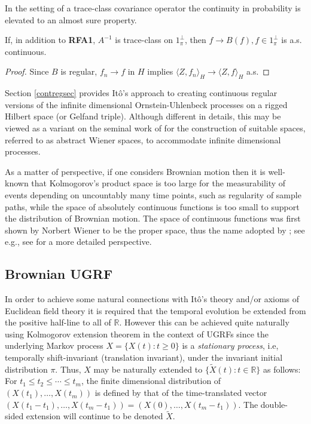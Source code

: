 \documentclass[11pt]{article}
\numberwithin{equation}{section}
\theoremstyle{definition}
\theoremstyle{remark}
\theoremstyle{definition}
\begin{document}
In the setting of a trace-class covariance operator
the continuity in probability
is elevated to an almost sure property.
\begin{cor}\label{traceclasscor}
 If, in addition to {\bf RFA1}, $ A^{-1}$
is trace-class on $1_\pi^\perp$, then
$f\to B(f), f\in 1_\pi^\perp$ is a.s. continuous.
\end{cor}
\begin{proof} Since $B$ is regular,  $f_n\to f$ in $H$ implies $\langle Z,f_n\rangle_H
\to\langle Z,f\rangle_H$ a.s. 
\end{proof}
Section \ref{contregsec} provides It\^o's \cite{ito}
approach to
creating continuous regular versions of the 
infinite dimensional Ornstein-Uhlenbeck processes
on a rigged Hilbert space (or Gelfand triple).  
Although different in details, this may be viewed
as a variant on the seminal work of \cite{grossberk}
for the construction of suitable spaces, referred
to as abstract Wiener spaces,  to accommodate
infinite dimensional processes.
\begin{remark}
As a matter of perspective, if one
considers Brownian motion then it is well-known
that Kolmogorov's product space is too large for
the measurability of events depending on uncountably
many time points, such as regularity of sample paths, while the space of absolutely continuous
functions is too small to support the distribution
of Brownian motion. The space of continuous functions
was first shown by Norbert Wiener to be the proper 
space, thus the name adopted by \cite{gross}; see
e.g., see \cite{stroockAWS} for a more detailed perspective.
\end{remark}

\subsection{Brownian UGRF}
In order to achieve some natural connections with It\^o's theory and/or
axioms of Euclidean field theory
it is required that the temporal evolution be extended from the positive half-line
to all of $\mathbb{R}$.  However this can be achieved quite naturally using
Kolmogorov extension theorem in the context
of UGRFs since the underlying Markov process $X=\{X(t):t\ge 0\}$ is a 
{\it stationary process}, i.e, temporally shift-invariant (translation invariant),
 under the invariant initial distribution $\pi$. Thus, $X$ may be
naturally extended to $\{\tilde{X}(t):t\in \mathbb{R}\}$ as follows:
For $t_1\le t_2\le\cdots\le t_m$, the finite dimensional distribution
of $(X(t_1),\dots,X(t_m))$ is defined by that of the time-translated
vector $(X(t_1-t_1),\dots,X(t_m-t_1)) = (X(0),\dots,X(t_m-t_1))$.
The double-sided extension will continue to be denoted $\tilde{X}$. 
\end{document}
